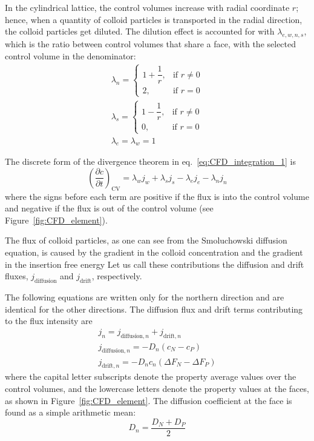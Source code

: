 \documentclass[10pt, a4paper]{article}
\begin{document}
\begin{multicols}{2}
In the cylindrical lattice, the control volumes increase with radial coordinate $r$; hence, when a quantity of colloid particles is transported in the radial direction, the colloid particles get diluted.
The dilution effect is accounted for with $\lambda_{e,w,n,s}$, which is the ratio between control volumes that share a face, with the selected control volume in the denominator:
\begin{eqnarray}
    \lambda_n =\begin{cases}
        1 + \dfrac{1}{r}, & \text{if } r \ne 0\\
        2, & \text{if } r = 0
    \end{cases}
    \\
    \lambda_s =\begin{cases}
        1 - \dfrac{1}{r}, & \text{if } r \ne 0\\
        0, & \text{if } r = 0
    \end{cases}
    \\
    \lambda_{e} = \lambda_{w} = 1
\end{eqnarray}

The discrete form of the divergence theorem in eq.~\ref{eq:CFD_integration_1} is
\begin{equation}
    \label{eq:CFD_integration_2}
    \left( \frac{\partial c}{\partial t} \right)_{\text{CV}} = \lambda_w j_w + \lambda_s j_s - \lambda_e j_e - \lambda_n j_n
\end{equation}
where the signs before each term are positive if the flux is into the control volume and negative if the flux is out of the control volume (see Figure~\ref{fig:CFD_element}).

The flux of colloid particles, as one can see from the Smoluchowski diffusion equation, is caused by the gradient in the colloid concentration and the gradient in the insertion free energy
Let us call these contributions the diffusion and drift fluxes, $j_{\text{diffusion}}$ and $j_{\text{drift}}$, respectively.

The following equations are written only for the northern direction and are identical for the other directions.
The diffusion flux and drift terms contributing to the flux intensity are
\begin{eqnarray}
    j_n = j_{\text{diffusion}, n} + j_{\text{drift}, n} \\
    j_{\text{diffusion}, n} = - D_n (c_N - c_P) \\
    j_{\text{drift}, n} = - D_n c_n (\Delta F_N - \Delta F_P)
\end{eqnarray}
where the capital letter subscripts denote the property average values over the control volumes, and the lowercase letters denote the property values at the faces, as shown in Figure~\ref{fig:CFD_element}.
The diffusion coefficient at the face is found as a simple arithmetic mean:
\begin{equation}
    D_n = \frac{D_N + D_P}{2}
\end{equation}


\end{multicols}
\end{document}
